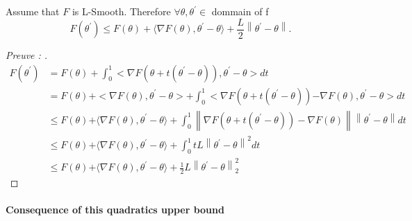 \begin{lem}
    Assume that $ F $  is L-Smooth. Therefore $ \forall \theta , \theta ^\prime \in  $ dommain of f 
    \[
        F(\theta ^\prime ) \leq  F(\theta ) + \langle \nabla F(\theta ) , \theta ^\prime  - \theta \rangle + \frac{L}{2} \left\| \theta ^\prime  - \theta  \right\| 
    .\]
    \begin{proof}[Preuve : ]
        \begin{align*}
            F (\theta ^\prime ) 
                &= F(\theta ) + \int_{0}^{1} < \nabla F(\theta  + t(\theta ^\prime - \theta )), \theta ^\prime - \theta > dt \\
                &= F(\theta ) \mathbf{+} < \nabla F(\theta ), \theta ^\prime  - \theta > + \int_{0}^{1} < \nabla F(\theta  + t(\theta ^\prime - \theta )) \mathbf{-} \nabla F(\theta ), \theta ^\prime  - \theta > dt \\
                &\leq F(\theta ) \mathbf{+} \langle \nabla F(\theta ), \theta ^\prime  - \theta \rangle + \int_{0}^{1} \left\| \nabla F(\theta + t(\theta ^\prime  - \theta )) - \nabla F(\theta ) \right\| \left\| \theta  ^\prime - \theta  \right\| dt \\
                &\leq F(\theta ) \mathbf{+} \langle \nabla F(\theta ), \theta ^\prime  - \theta \rangle + \int_{0}^{1} t L \left\| \theta ^\prime  - \theta  \right\|^2 dt \\
                &\leq F(\theta ) \mathbf{+} \langle \nabla F(\theta ), \theta ^\prime  - \theta \rangle + \frac{1}{2} L \left\| \theta  ^\prime  - \theta  \right\| ^2 _2
        \end{align*}
    \end{proof}
\end{lem}

\paragraph*{Consequence of this quadratics upper bound }

